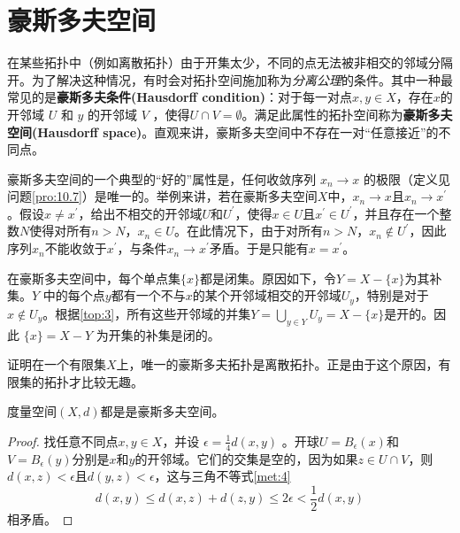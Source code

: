 \section{豪斯多夫空间}

在某些拓扑中（例如离散拓扑）由于开集太少，不同的点无法被非相交的邻域分隔开。为了解决这种情况，有时会对拓扑空间施加称为\emph{分离公理}的条件。其中一种最常见的是\textbf{豪斯多夫条件(Hausdorff condition)}：对于每一对点$x,y\in X$，存在$x$的开邻域 $U$ 和 $y$ 的开邻域 $V$ ，使得$U\cap V=\emptyset $。满足此属性的拓扑空间称为\textbf{豪斯多夫空间(Hausdorff space)}。直观来讲，豪斯多夫空间中不存在一对“任意接近”的不同点。

豪斯多夫空间的一个典型的“好的”属性是，任何收敛序列 $x_{n}\rightarrow x$ 的极限（定义见问题\ref{pro:10.7}）是唯一的。举例来讲，若在豪斯多夫空间$X$中，$x_{n}\rightarrow x$且$x_{n}\rightarrow x^{\prime}$。假设$x\neq x^{\prime}$，给出不相交的开邻域$U$和$U^{\prime}$，使得$x\in U$且$x^{\prime}\in U^{\prime}$，并且存在一个整数$N$使得对所有$n >N$，$x_{n} \in U$。在此情况下，由于对所有$n >N$，$x_{n} \notin U^{\prime}$，因此序列$x_{n}$不能收敛于$x^{\prime}$，与条件$x_{n}\rightarrow x^{\prime}$矛盾。于是只能有$x=x^{\prime}$。

在豪斯多夫空间中，每个单点集$\{x\}$都是闭集。原因如下，令$Y=X-\{x\}$为其补集。$Y$ 中的每个点$y$都有一个不与$x$的某个开邻域相交的开邻域$U_{y}$，特别是对于$x\notin U_{y}$。根据\ref{top:3}，所有这些开邻域的并集$Y=\bigcup _{y\in Y} U_{y} =X-\{x\}$是开的。因此 $\{x\}=X-Y$ 为开集的补集是闭的。

\begin{exercise}
	证明在一个有限集$X$上，唯一的豪斯多夫拓扑是离散拓扑。正是由于这个原因，有限集的拓扑才比较无趣。
\end{exercise}

\begin{theorem}\label{eg:10.4}
	度量空间$(X,d)$都是是豪斯多夫空间。
\end{theorem}

\begin{proof}
	找任意不同点$x,y\in X$，并设 $\epsilon =\frac{1}{4} d(x,y)$ 。开球$U=B_{\epsilon } (x)$和$V=B_{\epsilon } (y)$分别是$x$和$y$的开邻域。它们的交集是空的，因为如果$z\in U\cap V$，则$d(x,z)< \epsilon $且$d(y,z)< \epsilon $，这与三角不等式\ref{met:4}
\begin{equation*}
    d(x,y)\leq d(x,z)+d(z,y)\leq 2\epsilon < \frac{1}{2} d(x,y)
\end{equation*}
相矛盾。
\end{proof}

